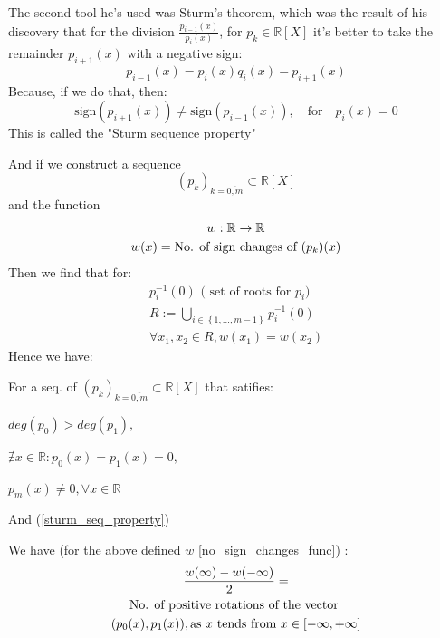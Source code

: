 The second tool he's used was Sturm's theorem, which was the result
of his discovery that for the division $\frac{p_{i-1}(x)}{p_i(x)}$,
for $p_k \in \mathbb{R}[X]$ it's better to take the remainder
$p_{i+1}(x)$ with a negative sign:
\begin{equation}\label{euclid_algorithm}
p_{i-1}(x) = p_i(x) q_i(x) - p_{i+1}(x) \tag{Euclid's Algorithm}
\end{equation}
Because, if we do that, then:
\begin{equation}\label{sturm_seq_property}
\text{sign} ( p_{i+1}(x) )  \neq \text{sign} ( p_{i-1}(x) ), \quad
\text{for} \quad p_i(x)=0 \tag{Sturm. Seq. Property}
\end{equation}
This is called the "Sturm sequence property"

And if we construct a sequence
\[
(p_k)_{k = \overline{0,m}} \subset \mathbb{R}[X]
\]
and the function
\begin{gather}\label{no_sign_changes_func}
w : \mathbb{R} \rightarrow \mathbb{R} \notag  \\
w(x) = \text{No. of sign changes of  } (p_k)(x) \notag
\end{gather}
Then we find that for:
\begin{gather*}
p_i^{-1}(0) \text{ ( set of roots for $p_i$) } \\
R := \bigcup_{i \in \left\{ 1, \dots, m-1 \right\} } p_i^{-1}(0) \\
\forall x_1, x_2 \in R, w(x_1) = w(x_2)
\end{gather*}
Hence we have:
\begin{lemma}\label{sturm_lemma}
For a seq. of $  (p_k)_{k = \overline{0,m}} \subset \mathbb{R}[X]$
that satifies:

$ deg(p_0) > deg(p_1), $

$\nexists x \in \mathbb{R} : p_0(x) = p_1(x) = 0, $

$p_m(x) \neq 0, \forall x \in \mathbb{R}$

And (\ref{sturm_seq_property})
\par
We have (for the above defined $w$ \ref{no_sign_changes_func}) :
\begin{gather}
	\frac{w(\infty) - w(-\infty)}{2} =  \notag \\
	\text{No. of positive rotations of the vector } \notag \\
	(p_0(x), p_1(x)), \text{as $x$ tends from  } x \in [-\infty, +\infty] \notag
\end{gather}
\end{lemma}

